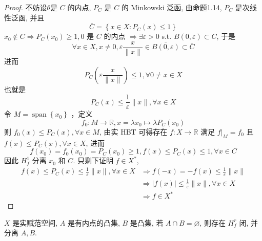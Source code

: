\documentclass[lang=cn,newtx,10pt,scheme=chinese,thmcnt=chapter]{elegantbook}
\begin{document}
\begin{proof}
不妨设$\theta$是 $C$ 的内点, $P_C$ 是 $C$ 的 Minkowski 泛函, 由命题1.14, $P_C$ 是次线性泛函, 并且
\begin{equation*}
\bar{C}=\left\{x \in X: P_C(x) \leqslant 1\right\}
\end{equation*}
$x_0 \notin C \Rightarrow P_C\left(x_0\right) \geqslant 1,0$ 是 $C$ 的内点 $\Rightarrow \exists \varepsilon>0$ s.t. $B(0, \varepsilon) \subset C$, 于是
\begin{equation*}
\forall x \in X, x \neq 0, \varepsilon \frac{x}{\|x\|} \in \overline{B(0, \varepsilon)} \subset \bar{C}
\end{equation*}
进而
\begin{equation*}
P_C\left(\varepsilon \frac{x}{\|x\|}\right) \leqslant 1, \forall 0 \neq x \in X
\end{equation*}
也就是
\begin{equation*}
P_C(x) \leqslant \frac{1}{\varepsilon}\|x\|, \forall x \in X
\end{equation*}
令 $M=\operatorname{span}\left\{x_0\right\}$ ，定义
\begin{equation*}
f_0: M \rightarrow \mathbb{R} , x=\lambda x_0 \mapsto \lambda P_C\left(x_0\right)
\end{equation*}
则 $f_0(x) \leqslant P_C(x), \forall x \in M$, 由实 HBT 可得存在 $f: X \rightarrow \mathbb{R}$ 满足 $\left.f\right|_M=f_0$ 且 $f(x) \leqslant P_C(x), \forall x \in X$, 进而
\begin{equation*}
f\left(x_0\right)=f_0\left(x_0\right)=P_C\left(x_0\right) \geqslant 1, f(x) \leqslant P_C(x) \leqslant 1, \forall x \in C
\end{equation*}
因此 $H_f^1$ 分离 $x_0$ 和 $C$.
只剩下证明 $f \in X^*$,
\begin{equation*}
\begin{aligned}
f(x) \leqslant P_C(x) \leqslant \frac{1}{\varepsilon}\|x\|, \forall x \in X & \Rightarrow f(-x)=-f(x) \leqslant \frac{1}{\varepsilon}\|x\| \\
& \Rightarrow|f(x)| \leqslant \frac{1}{\varepsilon}\|x\|, \forall x \in X \\
& \Rightarrow f \in X^*
\end{aligned}
\end{equation*}

\end{proof}
\begin{theorem}
$X$ 是实赋范空间, $A$ 是有内点的凸集, $B$ 是凸集, 若 $A \cap B=\varnothing$, 则存在 $H_f^r$ 闭, 并分离 $A, B$.
\end{theorem}
\end{document}
